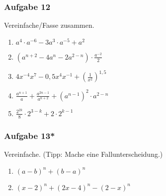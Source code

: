 \subsubsection{Aufgabe 12}
\vspace{-0.1cm}
Vereinfache/Fasse zusammen.
\begin{enumerate}
	\item \quad $ a^4 \cdot a^{-6} - 3a^3 \cdot a^{-5} + a^2 $
	\item \quad $ (a^{n+2} - 4a^n - 2a^{2-n})\cdot \frac{a^{-2}}{2} $
	\item \quad $ 4x^{-4}x^7 - 0,5 x^4x^{-1} + \left(\frac{1}{x^2}\right)^{1,5} $
	\item \quad $ \frac{a^{n+1}}{a} + \frac{a^{2n-1}}{a^{n+2}} + (a^{n-1})^2 \cdot a^{2-n} $
	\item \quad $ \frac{2^{2k}}{8} \cdot 2^{3-k} + 2 \cdot 2^{k-1} $
\end{enumerate}


\subsubsection{Aufgabe 13*}
\vspace{-0.1cm}
Vereinfache. (Tipp: Mache eine Fallunterscheidung.)
\begin{enumerate}
	\item \quad $ (a-b)^n + (b-a)^n $
	\item \quad $ (x-2)^n + (2x-4)^n - (2-x)^n $
\end{enumerate}
\pagebreak